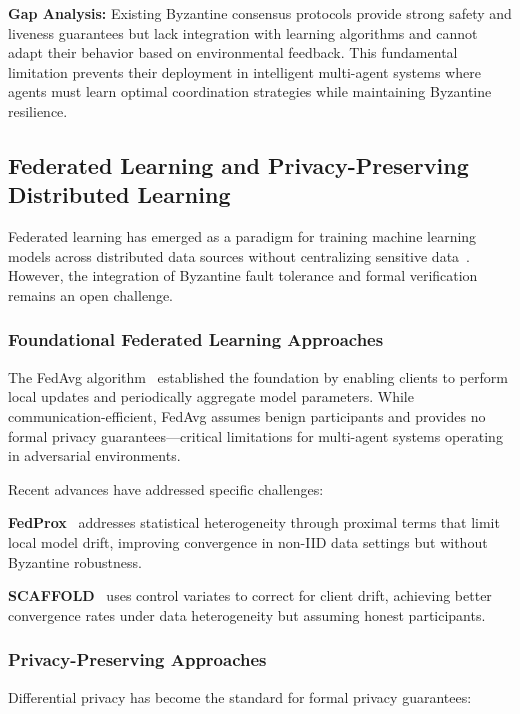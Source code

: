 \documentclass[conference]{IEEEtran}
\begin{document}
\textbf{Gap Analysis:} Existing Byzantine consensus protocols provide strong safety and liveness guarantees but lack integration with learning algorithms and cannot adapt their behavior based on environmental feedback. This fundamental limitation prevents their deployment in intelligent multi-agent systems where agents must learn optimal coordination strategies while maintaining Byzantine resilience.

\subsection{Federated Learning and Privacy-Preserving Distributed Learning}

Federated learning has emerged as a paradigm for training machine learning models across distributed data sources without centralizing sensitive data~\cite{mcmahan2017federated}. However, the integration of Byzantine fault tolerance and formal verification remains an open challenge.

\subsubsection{Foundational Federated Learning Approaches}

The FedAvg algorithm~\cite{mcmahan2017federated} established the foundation by enabling clients to perform local updates and periodically aggregate model parameters. While communication-efficient, FedAvg assumes benign participants and provides no formal privacy guarantees—critical limitations for multi-agent systems operating in adversarial environments.

Recent advances have addressed specific challenges:

\textbf{FedProx}~\cite{li2020federated} addresses statistical heterogeneity through proximal terms that limit local model drift, improving convergence in non-IID data settings but without Byzantine robustness.

\textbf{SCAFFOLD}~\cite{karimireddy2020scaffold} uses control variates to correct for client drift, achieving better convergence rates under data heterogeneity but assuming honest participants.

\subsubsection{Privacy-Preserving Approaches}

Differential privacy has become the standard for formal privacy guarantees:
\end{document}
